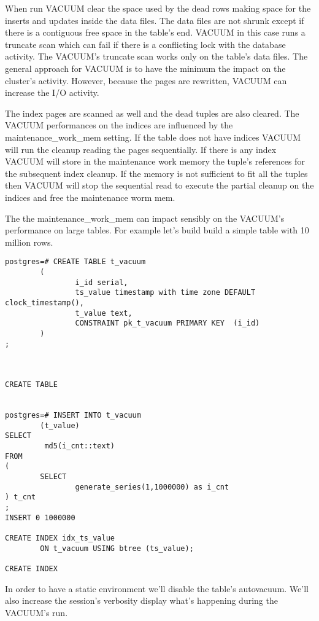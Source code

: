 When run VACUUM clear the space used by the dead rows making space for the inserts and updates inside the 
data files. The data files are not shrunk except if there is a contiguous free space in the table's 
end. VACUUM in this case runs a truncate scan which can fail if there is a conflicting lock with the 
database activity. The VACUUM's truncate scan works only on the table's data files. The general approach 
for VACUUM is to have the minimum the impact on the cluster's activity. However, because the pages are 
rewritten, VACUUM can increase the I/O activity.\newline

The index pages are scanned as well and the dead tuples are also cleared. The VACUUM performances on the 
indices are influenced by the maintenance\_work\_mem setting. If the table does not have indices VACUUM 
will run the cleanup reading the pages sequentially. If there is any index VACUUM will store in the 
maintenance work memory  the tuple's references for the subsequent index cleanup. If the memory is 
not sufficient to fit all the tuples then VACUUM will stop the sequential read to execute the 
partial cleanup on the indices and free the maintenance worm mem.\newline

The the maintenance\_work\_mem  can impact sensibly on the VACUUM's performance on large tables. For example 
let's build build a simple table with 10 million rows. 


\begin{lstlisting}[style=pgsql]
postgres=# CREATE TABLE t_vacuum 
        (
                i_id serial,
                ts_value timestamp with time zone DEFAULT clock_timestamp(),
                t_value text,
                CONSTRAINT pk_t_vacuum PRIMARY KEY  (i_id)
        )
;



CREATE TABLE


postgres=# INSERT INTO t_vacuum
        (t_value)
SELECT 
         md5(i_cnt::text)
FROM
(
        SELECT
                generate_series(1,1000000) as i_cnt
) t_cnt
;
INSERT 0 1000000

CREATE INDEX idx_ts_value 
        ON t_vacuum USING btree (ts_value);

CREATE INDEX

\end{lstlisting}
In order to have a static environment we'll disable the table's autovacuum. We'll also increase the 
session's verbosity display what's happening during the VACUUM's run.\newline

